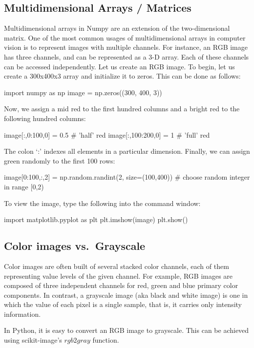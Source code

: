 \documentclass{article}
\begin{document}
\subsection{Multidimensional Arrays / Matrices}
Multidimensional arrays in Numpy are an extension of the two-dimensional matrix. One of the most common usages of multidimensional arrays in computer vision is to represent images with multiple channels. For instance, an RGB image has three channels, and can be represented as a 3-D array. Each of these channels can be accessed independently.
Let us create an RGB image. To begin, let us create a 300x400x3 array and initialize it to zeros. This can be done as follows:
\begin{python}
import numpy as np
image = np.zeros((300, 400, 3))
\end{python}

Now, we assign a mid red to the first hundred columns and a bright red to the following hundred columns:
\begin{python}
image[:,0:100,0] = 0.5 # 'half' red
image[:,100:200,0] = 1 # 'full' red
\end{python}

The colon `:' indexes all elements in a particular dimension.
Finally, we can assign green randomly to the first 100 rows:
\begin{python}
image[0:100,:,2] = np.random.randint(2, size=(100,400))
# choose random integer in range [0,2)
\end{python}

To view the image, type the following into the command window:
\begin{python}
import matplotlib.pyplot as plt
plt.imshow(image)
plt.show()
\end{python}

\subsection{Color images vs.~Grayscale}
Color images are often built of several stacked color channels, each of them representing value levels of the given channel. For example, RGB images are composed of three independent channels for red, green and blue primary color components. In contrast, a grayscale image (aka black and white image) is one in which the value of each pixel is a single sample, that is, it carries only intensity information.

In Python, it is easy to convert an RGB image to grayscale. This can be achieved using scikit-image's \href{http://scikit-image.org/docs/stable/api/skimage.color.html#rgb2gray}{$rgb2gray$} function.
\end{document}

